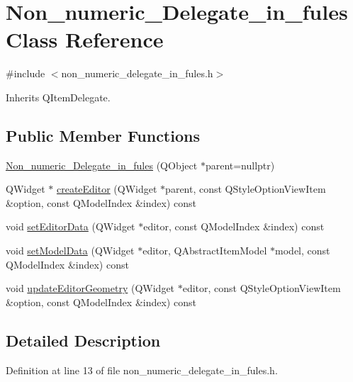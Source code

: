 \hypertarget{classNon__numeric__Delegate__in__fules}{}\section{Non\+\_\+numeric\+\_\+\+Delegate\+\_\+in\+\_\+fules Class Reference}
\label{classNon__numeric__Delegate__in__fules}


{\ttfamily \#include $<$non\+\_\+numeric\+\_\+delegate\+\_\+in\+\_\+fules.\+h$>$}



Inherits Q\+Item\+Delegate.

\subsection*{Public Member Functions}
\begin{DoxyCompactItemize}
\item 
\hyperlink{classNon__numeric__Delegate__in__fules_a67d03bdb8f3797c80f8987c429e5d420}{Non\+\_\+numeric\+\_\+\+Delegate\+\_\+in\+\_\+fules} (Q\+Object $\ast$parent=nullptr)
\item 
Q\+Widget $\ast$ \hyperlink{classNon__numeric__Delegate__in__fules_a5deaa64416800b2b76bddc65f509e51b}{create\+Editor} (Q\+Widget $\ast$parent, const Q\+Style\+Option\+View\+Item \&option, const Q\+Model\+Index \&index) const
\item 
void \hyperlink{classNon__numeric__Delegate__in__fules_a164816b371172eb34b15233572ca32d5}{set\+Editor\+Data} (Q\+Widget $\ast$editor, const Q\+Model\+Index \&index) const
\item 
void \hyperlink{classNon__numeric__Delegate__in__fules_a31b9113d3edd7aa449f712b449ba0b08}{set\+Model\+Data} (Q\+Widget $\ast$editor, Q\+Abstract\+Item\+Model $\ast$model, const Q\+Model\+Index \&index) const
\item 
void \hyperlink{classNon__numeric__Delegate__in__fules_ac13c2aff394211c408ff1e7d504ee717}{update\+Editor\+Geometry} (Q\+Widget $\ast$editor, const Q\+Style\+Option\+View\+Item \&option, const Q\+Model\+Index \&index) const
\end{DoxyCompactItemize}


\subsection{Detailed Description}


Definition at line 13 of file non\+\_\+numeric\+\_\+delegate\+\_\+in\+\_\+fules.\+h.



